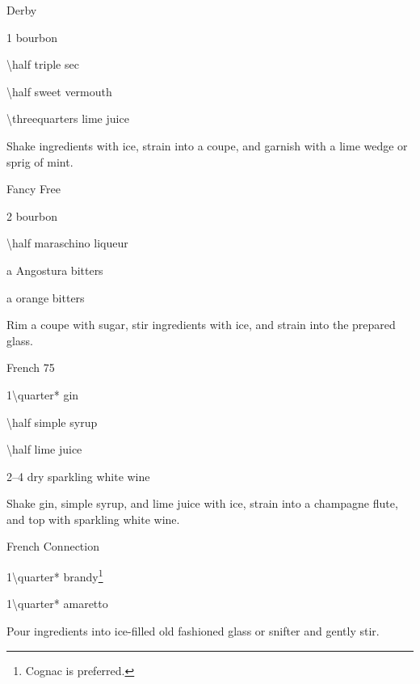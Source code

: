 \begin{Cocktail}{Derby}
	\begin{Ingredients}
	\item \SI{1}{\oz} bourbon
	\item \SI{\half}{\oz} triple sec
	\item \SI{\half}{\oz} sweet vermouth
	\item \SI{\threequarters}{\oz} lime juice
	\end{Ingredients}
	
	\begin{Instructions}
	Shake ingredients with ice, strain into a coupe, and garnish with a lime wedge or sprig of mint.
	\end{Instructions}
\end{Cocktail}

\begin{Cocktail}{Fancy Free}
	\begin{Ingredients}
	\item \SI{2}{\oz} bourbon
	\item \SI{\half}{\oz} maraschino liqueur
	\item a \si{\dash} Angostura bitters
	\item a \si{\dash} orange bitters
	\end{Ingredients}
	
	\begin{Instructions}
	Rim a coupe with sugar, stir ingredients with ice, and strain into the prepared glass.
	\end{Instructions}
\end{Cocktail}

\begin{Cocktail}{French 75}
	\begin{Ingredients}
	\item \SI{1\quarter*}{\oz} gin
	\item \SI{\half}{\oz} simple syrup
	\item \SI{\half}{\oz} lime juice
	\item \SIrange{2}{4}{\oz} dry sparkling white wine
	\end{Ingredients}
	
	\begin{Instructions}
	Shake gin, simple syrup, and lime juice with ice, strain into a champagne flute, and top with sparkling white wine.
	\end{Instructions}
\end{Cocktail}

\begin{Cocktail}{French Connection}
	\begin{Ingredients}
	\item \SI{1\quarter*}{\oz} brandy\footnote{Cognac is preferred.}
	\item \SI{1\quarter*}{\oz} amaretto
	\end{Ingredients}
	
	\begin{Instructions}
	Pour ingredients into ice-filled old fashioned glass or snifter and gently stir.
	\end{Instructions}
\end{Cocktail}

